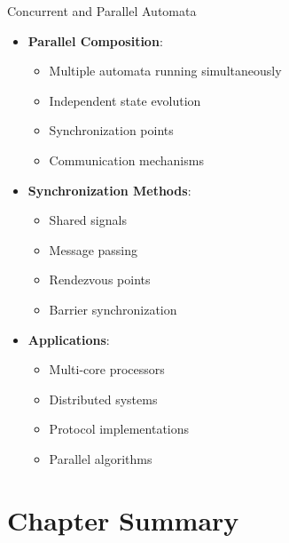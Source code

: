 \documentclass[aspectratio=169,11pt]{beamer}
\newcommand{\concept}[1]{\textbf{\color{accentcolor}#1}}
\begin{document}
\begin{frame}{Concurrent and Parallel Automata}
\begin{itemize}
\item \concept{Parallel Composition}:
\begin{itemize}
\item Multiple automata running simultaneously
\item Independent state evolution
\item Synchronization points
\item Communication mechanisms
\end{itemize}
\vspace{0.5cm}
\item \concept{Synchronization Methods}:
\begin{itemize}
\item Shared signals
\item Message passing
\item Rendezvous points
\item Barrier synchronization
\end{itemize}
\vspace{0.3cm}
\item \concept{Applications}:
\begin{itemize}
\item Multi-core processors
\item Distributed systems
\item Protocol implementations
\item Parallel algorithms
\end{itemize}
\end{itemize}
\end{frame}

\section{Chapter Summary}
\end{document}
